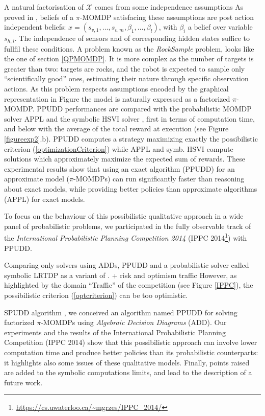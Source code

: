 A natural factorisation of $\mathcal{X}$ comes from some independence assumptions
As proved in \cite{DBLP:conf/aaai/DrougardTFD14}, 
beliefs of a $\pi$-MOMDP satisfacing these assumptions
are post action independent beliefs: $x = (s_{v,1}, \ldots, s_{v,m}, \beta_1, \ldots, \beta_{l})$, 
with $\beta_i$ a belief over variable $s_{h,i}$.
The independence of sensors and of corresponding hidden states suffice to fullfil these conditions.
A problem known as 
the \textit{RockSample} problem, 
looks like the one 
of section \ref{QPMOMDP}.
It is more complex 
as the number of targets
is greater than two: 
targets are rocks, 
and the robot is expected 
to sample only ``scientifically good'' ones,
estimating their nature 
through specific observation actions.
As this problem respects assumptions 
encoded by the graphical 
representation in Figure  
the model is naturally expressed 
as a factorized $\pi$-MOMDP. 
PPUDD performances are compared with 
the probabilistic MOMDP solver APPL \cite{Kurniawati08sarsop:efficient}
and the symbolic HSVI solver \cite{citeulike:2961378},
first in terms of computation time, 
and below with the average of 
the total reward at execution 
(see Figure \ref{figureexp2}.b). 
PPUDD computes a strategy maximizing 
exactly the possibilistic criterion 
(\ref{optimizationCriterion})
while APPL and symb. HSVI compute solutions
which approximately maximize the expected sum of rewards.
These experimental results show that using an exact algorithm 
(PPUDD) for an approximate model ($\pi$-MOMDPs) 
can run significantly faster 
than reasoning about exact models, 
while providing better policies 
than approximate algorithms (APPL) 
for exact models.

To focus on the behaviour 
of this possibilistic qualitative approach 
in a wide panel of probabilistic problems, 
we participated  in the fully observable track of the 
\textit{International Probabilistic Planning Competition 2014} 
(IPPC 2014\footnote{\url{https://cs.uwaterloo.ca/~mgrzes/IPPC_2014/}})
with PPUDD. 

Comparing only solvers using ADDs, 
PPUDD and a probabilistic solver called symbolic LRTDP 
as a variant of \cite{Bonet03labeledrtdp:}.
+ risk and optimism traffic
However, as highlighted by the domain ``Traffic''
of the competition (see Figure \ref{IPPC}), 
the possibilistic criterion (\ref{optcriterion})
can be too optimistic.

SPUDD algorithm \cite{Hoey99spudd:stochastic},
we conceived an algorithm named PPUDD \cite{DBLP:conf/aaai/DrougardTFD14} 
for solving factorized $\pi$-MOMDPs
using \textit{Algebraic Decision Diagrams} (ADD).
Our experiments and the  results 
of the International Probabilistic Planning Competition (IPPC 2014)
show that this possibilistic approach
can involve lower computation time
and produce better policies
than its probabilistic counterparts:
it highlights also some issues 
of these qualitative models.
Finally, points raised are added to 
the symbolic computations limits,
and lead to the description
of a future work.


